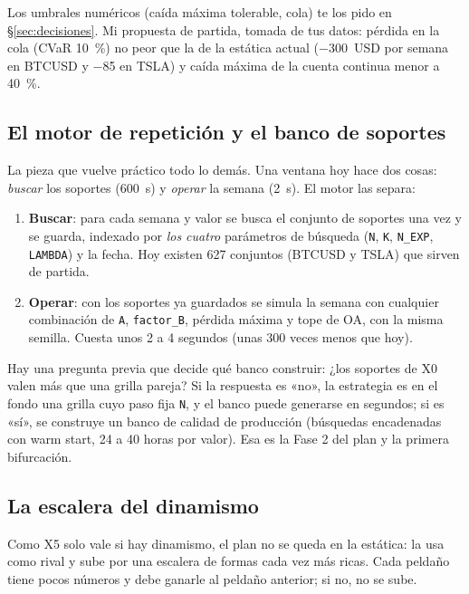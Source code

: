 \documentclass[11pt,a4paper]{article}
\newcommand{\code}[1]{\texttt{\small #1}}
\newcommand{\mn}[1]{$-$#1}
\begin{document}
Los umbrales numéricos (caída máxima tolerable, cola) te los pido en §\ref{sec:decisiones}. Mi propuesta de
partida, tomada de tus datos: pérdida en la cola (CVaR 10~\%) no peor que la de la estática actual
(\mn{}300~USD por semana en BTCUSD y \mn{}85 en TSLA) y caída máxima de la cuenta continua menor a 40~\%.

\subsection{El motor de repetición y el banco de soportes}\label{sec:motor}

La pieza que vuelve práctico todo lo demás. Una ventana hoy hace dos cosas: \emph{buscar} los soportes
(600~s) y \emph{operar} la semana (2~s). El motor las separa:

\begin{enumerate}[leftmargin=1.6em]
  \item \textbf{Buscar}: para cada semana y valor se busca el conjunto de soportes una vez y se guarda, indexado por
        \emph{los cuatro} parámetros de búsqueda (\code{N}, \code{K}, \code{N\_EXP}, \code{LAMBDA}) y la fecha. Hoy
        existen 627 conjuntos (BTCUSD y TSLA) que sirven de partida.
  \item \textbf{Operar}: con los soportes ya guardados se simula la semana con cualquier combinación de
        \code{A}, \code{factor\_B}, pérdida máxima y tope de OA, con la misma semilla. Cuesta unos 2 a 4 segundos
        (unas 300 veces menos que hoy).
\end{enumerate}

Hay una pregunta previa que decide qué banco construir: ¿los soportes de X0 valen más que una grilla pareja?
Si la respuesta es «no», la estrategia es en el fondo una grilla cuyo paso fija \code{N}, y el banco puede
generarse en segundos; si es «sí», se construye un banco de calidad de producción (búsquedas encadenadas con
warm start, 24 a 40 horas por valor). Esa es la Fase 2 del plan y la primera bifurcación.

\subsection{La escalera del dinamismo}\label{sec:escalera}

Como X5 solo vale si hay dinamismo, el plan no se queda en la estática: la usa como rival y sube por una escalera
de formas cada vez más ricas. Cada peldaño tiene pocos números y debe ganarle al peldaño anterior; si no, no se sube.
\end{document}
